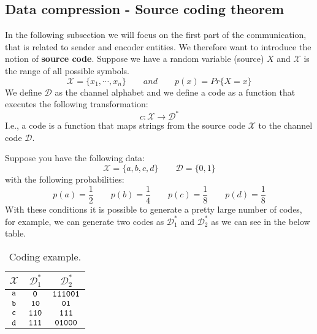 \subsection{Data compression - Source coding theorem}
In the following subsection we will focus on the first part of the communication, that is related to sender and encoder entities. We therefore want to introduce the notion of \textbf{source code}.
Suppose we have a random variable (source) $X$ and $\mathcal{X}$ is the range of all possible symbols.
$$\mathcal{X} = \{x_1, \cdots, x_n\} \qquad and \qquad p(x) = Pr\{X=x\}$$
We define $\mathcal{D}$ as the channel alphabet and we define a code as a function that executes the following transformation:
$$c : \mathcal{X} \rightarrow \mathcal{D}^*$$
I.e., a code is a function that maps strings from the source code $\mathcal{X}$ to the channel code $\mathcal{D}$.
\begin{exmp} Suppose you have the following data:
	$$\mathcal{X} = \{a, b, c, d\} \qquad \mathcal{D} = \{0,1\}$$
	with the following probabilities:
	$$p(a) = \frac{1}{2} \qquad p(b) = \frac{1}{4} \qquad p(c) = \frac{1}{8} \qquad p(d) = \frac{1}{8}$$
	With these conditions it is possible to generate a pretty large number of codes, for example, we can generate two codes as $\mathcal{D}^*_1$ and $\mathcal{D}^*_2$ as we can see in the below table.
	\begin{table}[H]
		\centering
		\begin{tabular}{| c | c | c |}
			\hline
			$\mathcal{X}$ & $\mathcal{D}^*_1$ & $\mathcal{D}^*_2$\\\hline
			$\verb|a|$ & $\verb|0|$ & $\verb|111001|$ \\
			$\verb|b|$ & $\verb|10|$ & $\verb|01|$ \\
			$\verb|c|$ & $\verb|110|$ & $\verb|111|$ \\
			$\verb|d|$ & $\verb|111|$ & $\verb|01000|$ \\
			\hline
		\end{tabular}
		\caption{Coding example.}
	\end{table}
\end{exmp}

